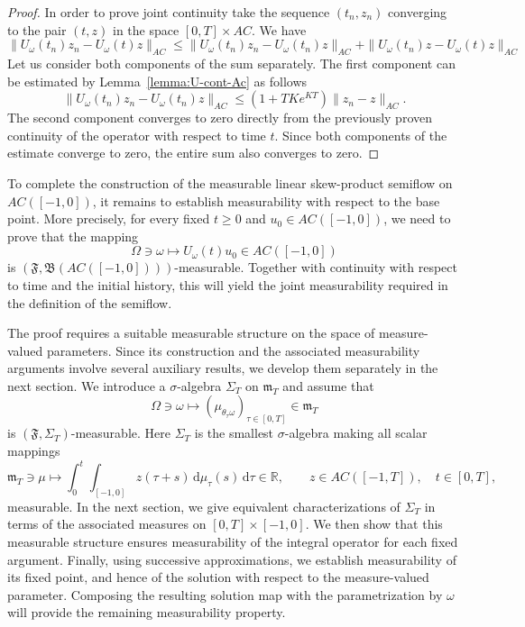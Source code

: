 \documentclass[reqno]{amsart}
\theoremstyle{plain}
\numberwithin{equation}{section}
\numberwithin{definition}{section}
\newcommand{\dd}{\ensuremath{\mathrm{d}}}
\begin{document}
{\begin{proof}
In order to prove joint continuity take the sequence $(t_n, z_n)$ converging to the pair $(t, z)$ in the space $[0, T] \times AC$. We have 
\begin{equation*}
\|U_\omega(t_n)z_n - U_\omega(t)z\|_{AC}
\le \|U_\omega(t_n)z_n - U_\omega(t_n)z\|_{AC} + \|U_\omega(t_n)z - U_\omega(t)z\|_{AC}
\end{equation*}
Let us consider both components of the sum separately.
The first component can be estimated by Lemma~\ref{lemma:U-cont-Ac} as follows 
\begin{equation*}
    \|U_\omega(t_n)z_n - U_\omega(t_n)z\|_{AC} \le (1+TKe^{KT}) \|z_n - z\|_{AC}. 
\end{equation*}
The second component converges to zero directly from the previously proven continuity of the operator with respect to time $t$. Since both components of the estimate converge to zero, the entire sum also converges to zero. 
\end{proof}

To complete the construction of the measurable linear
skew-product semiflow on $AC([-1,0])$, it remains to establish
measurability with respect to the base point. More precisely,
for every fixed $t\ge0$ and $u_0\in AC([-1,0])$, we need to
prove that the mapping
\begin{equation*}
    \Omega\ni\omega
    \mapsto U_\omega(t)u_0\in AC([-1,0])
\end{equation*}
is $(\mathfrak{F} ,\mathfrak{B} (AC([-1,0])))$-measurable.
Together with continuity with respect to time and the initial
history, this will yield the joint measurability required
in the definition of the semiflow.

The proof requires a suitable measurable structure on the
space of measure-valued parameters. Since its construction
and the associated measurability arguments involve several
auxiliary results, we develop them separately in the next
section. We introduce a $\sigma$-algebra $\Sigma_T$
on $\mathfrak m_T$ and assume that
\begin{equation*}
    \Omega\ni\omega
    \mapsto
    (\mu_{\theta_\tau\omega})_{\tau\in[0,T]}
    \in\mathfrak m_T
\end{equation*}
is $(\mathfrak{F},\Sigma_T)$-measurable.
Here $\Sigma_T$ is the smallest $\sigma$-algebra making
all scalar mappings
\begin{equation*}
    \mathfrak m_T\ni\mu
    \mapsto
    \int_0^t\int_{[-1,0]}
    z(\tau+s)\,\dd\mu_\tau(s)\,\dd\tau
    \in\mathbb R,
    \qquad
    z\in AC([-1,T]),\quad t\in[0,T],
\end{equation*}
measurable. In the next section, we give equivalent characterizations
of $\Sigma_T$ in terms of the associated measures on
$[0,T]\times[-1,0]$. We then show that this measurable
structure ensures measurability of the integral operator
for each fixed argument. Finally, using successive
approximations, we establish measurability of its fixed
point, and hence of the solution with respect to the
measure-valued parameter. Composing the resulting solution
map with the parametrization by $\omega$ will provide
the remaining measurability property.


}
\end{document}
